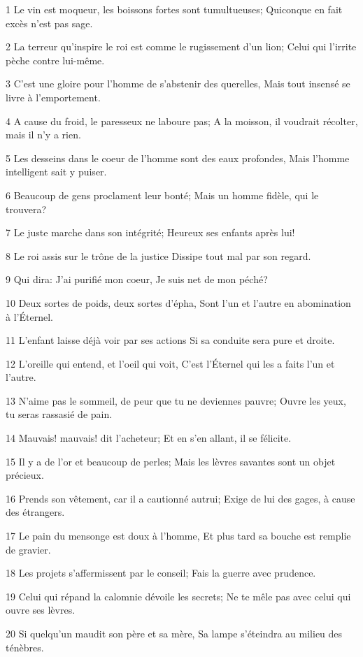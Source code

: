 \par 1 Le vin est moqueur, les boissons fortes sont tumultueuses; Quiconque en fait excès n'est pas sage.
\par 2 La terreur qu'inspire le roi est comme le rugissement d'un lion; Celui qui l'irrite pèche contre lui-même.
\par 3 C'est une gloire pour l'homme de s'abstenir des querelles, Mais tout insensé se livre à l'emportement.
\par 4 A cause du froid, le paresseux ne laboure pas; A la moisson, il voudrait récolter, mais il n'y a rien.
\par 5 Les desseins dans le coeur de l'homme sont des eaux profondes, Mais l'homme intelligent sait y puiser.
\par 6 Beaucoup de gens proclament leur bonté; Mais un homme fidèle, qui le trouvera?
\par 7 Le juste marche dans son intégrité; Heureux ses enfants après lui!
\par 8 Le roi assis sur le trône de la justice Dissipe tout mal par son regard.
\par 9 Qui dira: J'ai purifié mon coeur, Je suis net de mon péché?
\par 10 Deux sortes de poids, deux sortes d'épha, Sont l'un et l'autre en abomination à l'Éternel.
\par 11 L'enfant laisse déjà voir par ses actions Si sa conduite sera pure et droite.
\par 12 L'oreille qui entend, et l'oeil qui voit, C'est l'Éternel qui les a faits l'un et l'autre.
\par 13 N'aime pas le sommeil, de peur que tu ne deviennes pauvre; Ouvre les yeux, tu seras rassasié de pain.
\par 14 Mauvais! mauvais! dit l'acheteur; Et en s'en allant, il se félicite.
\par 15 Il y a de l'or et beaucoup de perles; Mais les lèvres savantes sont un objet précieux.
\par 16 Prends son vêtement, car il a cautionné autrui; Exige de lui des gages, à cause des étrangers.
\par 17 Le pain du mensonge est doux à l'homme, Et plus tard sa bouche est remplie de gravier.
\par 18 Les projets s'affermissent par le conseil; Fais la guerre avec prudence.
\par 19 Celui qui répand la calomnie dévoile les secrets; Ne te mêle pas avec celui qui ouvre ses lèvres.
\par 20 Si quelqu'un maudit son père et sa mère, Sa lampe s'éteindra au milieu des ténèbres.
